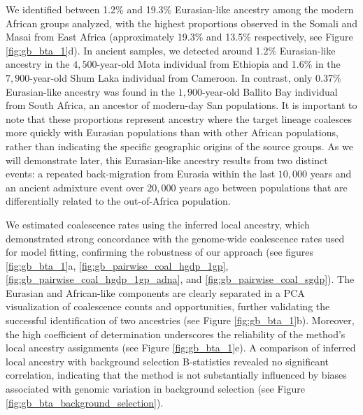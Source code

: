 We identified between 1.2\% and 19.3\% Eurasian-like ancestry among the modern African groups analyzed, with the highest proportions observed in the Somali and Masai from East Africa (approximately 19.3\% and 13.5\% respectively, see Figure \ref{fig:gb_bta_1}d). In ancient samples, we detected around 1.2\% Eurasian-like ancestry in the $4{,}500$-year-old Mota individual from Ethiopia and 1.6\% in the $7{,}900$-year-old Shum Laka individual from Cameroon. In contrast, only 0.37\% Eurasian-like ancestry was found in the $1{,}900$-year-old Ballito Bay individual from South Africa, an ancestor of modern-day San populations. It is important to note that these proportions represent ancestry where the target lineage coalesces more quickly with Eurasian populations than with other African populations, rather than indicating the specific geographic origins of the source groups. As we will demonstrate later, this Eurasian-like ancestry results from two distinct events: a repeated back-migration from Eurasia within the last $10{,}000$ years and an ancient admixture event over $20{,}000$ years ago between populations that are differentially related to the out-of-Africa population.

We estimated coalescence rates using the inferred local ancestry, which demonstrated strong concordance with the genome-wide coalescence rates used for model fitting, confirming the robustness of our approach (see figures \ref{fig:gb_bta_1}a, \ref{fig:gb_pairwise_coal_hgdp_1gp}, \ref{fig:gb_pairwise_coal_hgdp_1gp_adna}, and \ref{fig:gb_pairwise_coal_sgdp}). The Eurasian and African-like components are clearly separated in a PCA visualization of coalescence counts and opportunities, further validating the successful identification of two ancestries (see Figure \ref{fig:gb_bta_1}b). Moreover, the high coefficient of determination underscores the reliability of the method’s local ancestry assignments (see Figure \ref{fig:gb_bta_1}e). A comparison of inferred local ancestry with background selection B-statistics \cite{murphy2022broad} revealed no significant correlation, indicating that the method is not substantially influenced by biases associated with genomic variation in background selection (see Figure \ref{fig:gb_bta_background_selection}).

